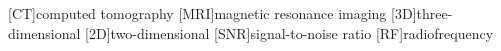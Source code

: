 \begin{acronym}
    [CT]{computed tomography}
    [MRI]{magnetic resonance imaging}
    [3D]{three-dimensional}
    [2D]{two-dimensional}
    [SNR]{signal-to-noise ratio}
    [RF]{radiofrequency}
\end{acronym}